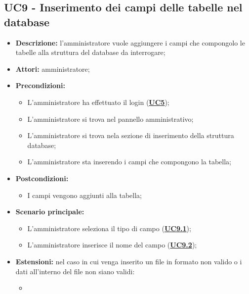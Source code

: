 \documentclass[5pt]{article}
\begin{document}
\subsection{UC9 - Inserimento dei campi delle tabelle nel database}
\label{sec:UC9}
\begin{itemize}
	\item \textbf{Descrizione:} l’amministratore vuole aggiungere i campi che compongolo le tabelle alla struttura del database da interrogare;
	\item \textbf{Attori:} amministratore;
	\item \textbf{Precondizioni:} 
	\begin{itemize}
		\item L’amministratore ha effettuato il login (\hyperref[sec:UC5]{\textbf{UC5}});
		\item L’amministratore si trova nel pannello amministrativo;
		\item L’amministratore si trova nela sezione di inserimento della struttura database;
		\item L’amministratore sta inserendo i campi che compongono la tabella;
	\end{itemize}
	\item \textbf{Postcondizioni:} 
	\begin{itemize}
		\item I campi vengono aggiunti alla tabella;
	\end{itemize}
	\item \textbf{Scenario principale:} 
	\begin{itemize}
		\item L’amministratore seleziona il tipo di campo  (\hyperref[sec:UC9.1]{\textbf{UC9.1}});
		\item L'amministratore inserisce il nome del campo (\hyperref[sec:UC9.1]{\textbf{UC9.2}});
	\end{itemize}
	\item \textbf{Estensioni:} nel caso in cui venga inserito un file in formato non valido o i dati all’interno del file non siano validi:
	\begin{itemize}
		\item
	\end{itemize}
\end{itemize}
\end{document}
